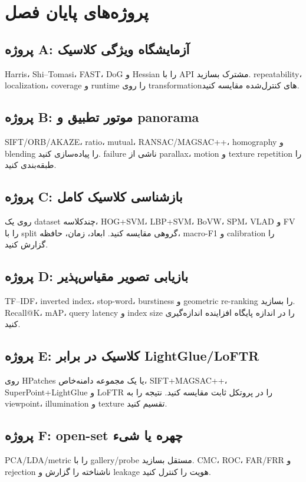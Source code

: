 \documentclass[12pt,openany,oneside]{book}
\begin{document}
\section{پروژه‌های پایان فصل}
\subsection{پروژه A: آزمایشگاه ویژگی کلاسیک}
Harris، Shi--Tomasi، FAST، DoG و Hessian را با API مشترک بسازید. repeatability، localization، coverage و runtime را روی transformationهای کنترل‌شده مقایسه کنید.

\subsection{پروژه B: موتور تطبیق و panorama}
SIFT/ORB/AKAZE، ratio، mutual، RANSAC/MAGSAC++، homography و blending را پیاده‌سازی کنید. failure ناشی از parallax، motion و texture repetition را طبقه‌بندی کنید.

\subsection{پروژه C: بازشناسی کلاسیک کامل}
روی یک dataset چندکلاسه، HOG+SVM، LBP+SVM، BoVW، SPM، VLAD و FV را با split گروهی مقایسه کنید. ابعاد، زمان، حافظه، macro-F1 و calibration را گزارش کنید.

\subsection{پروژه D: بازیابی تصویر مقیاس‌پذیر}
TF--IDF، inverted index، stop-word، burstiness و geometric re-ranking را بسازید. Recall@K، mAP، query latency و index size را در اندازه پایگاه افزاینده اندازه‌گیری کنید.

\subsection{پروژه E: کلاسیک در برابر LightGlue/LoFTR}
روی HPatches یا یک مجموعه دامنه‌خاص، SIFT+MAGSAC++، SuperPoint+LightGlue و LoFTR را در پروتکل ثابت مقایسه کنید. نتیجه را به viewpoint، illumination و texture تقسیم کنید.

\subsection{پروژه F: open-set چهره یا شیء}
PCA/LDA/metric را با gallery/probe مستقل بسازید. CMC، ROC، FAR/FRR و rejection ناشناخته را گزارش و leakage هویت را کنترل کنید.
\end{document}
